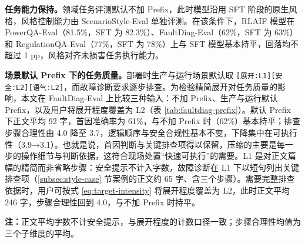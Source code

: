 \documentclass[fontset=fandol,type=master,campus=shenzhen,etitleauto=true]{hithesisbook}
\begin{document}
\textbf{任务能力保持。}领域任务评测默认不加 Prefix，此时模型沿用 SFT 阶段的原生风格，风格控制能力由 ScenarioStyle-Eval 单独评测。在该条件下，RLAIF 模型在 PowerQA-Eval（81.5\%，SFT 为 82.3\%）、FaultDiag-Eval（62\%，SFT 为 63\%）和 RegulationQA-Eval（77\%，SFT 为 78\%）上与 SFT 模型基本持平，回落均不超过 1 pp，风格对齐未损害任务执行能力。

\textbf{场景默认 Prefix 下的任务质量。}部署时生产与运行场景默认取 \texttt{[展开:L1][安全:L2][语气:L2]}，而故障诊断要求逐步排查。为检验精简展开对任务质量的影响，本文在 FaultDiag-Eval 上比较三种输入：不加 Prefix、生产与运行默认 Prefix，以及用户将展开程度覆盖为 L2（表 \ref{tab:faultdiag-prefix}）。默认 Prefix 下正文平均 92 字，首因准确率为 61\%，与不加 Prefix 时（62\%）基本持平；排查步骤合理性由 4.0 降至 3.7，逻辑顺序与安全合规性基本不变，下降集中在可执行性（3.9→3.1）。也就是说，首因判断与关键排查项得以保留，压缩的主要是每一步的操作细节与判断依据，这符合现场处置“快速可执行”的需要。L1 是对正文篇幅的精简而非省略步骤：安全提示不计入字数，故障诊断在 L1 下以短句列出关键排查项（\ref{subsec:style-case} 节案例的正文约 65 字、含三个步骤）。需要完整排查依据时，用户可按式 \eqref{eq:target-intensity} 将展开程度覆盖为 L2，此时正文平均 246 字，步骤合理性回到 4.0，与不加 Prefix 时持平。

\begin{table}[htbp]
\centering
\caption{不同 Prefix 下 RLAIF 模型在 FaultDiag-Eval 上的表现}
\label{tab:faultdiag-prefix}
\small
\setlength{\tabcolsep}{4pt}
\renewcommand{\arraystretch}{1.15}

\vspace{0.2cm}
\parbox{\linewidth}{\small \textbf{注：}正文平均字数不计安全提示，与展开程度的计数口径一致；步骤合理性均值为三个子维度的平均。}
\end{table}
\end{document}
